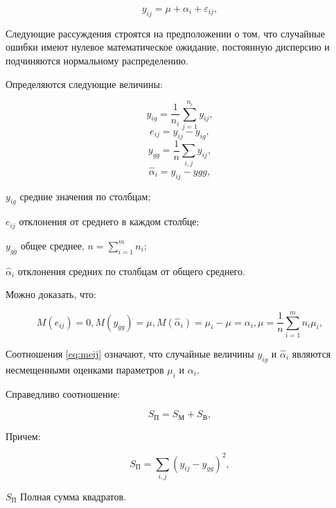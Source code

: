 \begin{equation}
\label{eq:watcha}
y_{ij} = \mu+\alpha_i+\varepsilon_{ij},
\end{equation}


Следующие рассуждения строятся на предположении о том, что случайные ошибки имеют нулевое математическое ожидание, постоянную дисперсию и подчиняются нормальному распределению.

Определяются следующие величины:

\begin{equation}
\label{eq:yig}
y_{ig}=\frac{1}{n_i}\sum_{j=1}^{n_i}{y_{ij}},
\end{equation}
\begin{equation}
\label{eq:eij}
e_{ij}=y_{ij}-y_{ig},
\end{equation}
\begin{equation}
\label{eq:ygg}
y_{gg}=\frac{1}{n}\sum_{i,j}{y_{ij}},
\end{equation}
\begin{equation}
\label{eq:alphai}
\widehat{\alpha}_i=y_{ij}-y{gg},
\end{equation}
\begin{eqexpl}[15mm]
\item{$y_{ig}$} средние значения по столбцам;
\item{$e_{ij}$} отклонения от среднего в каждом столбце;
\item{$y_{gg}$} общее среднее, $n=\sum_{i=1}^{m}{n_i}$;
\item{$\widehat{\alpha}_i$} отклонения средних по столбцам от общего среднего.
\end{eqexpl}

Можно доказать, что:

\begin{equation}
\label{eq:meij}
M(e_{ij})=0,M(y_{gg})=\mu,M(\widehat{\alpha}_i)=\mu_i-\mu=\alpha_i, \mu=\frac{1}{n}\sum_{i=1}^{m}{n_i\mu_i},
\end{equation}

Соотношения \eqref{eq:meij} означают, что случайные величины $y_{ig}$ и $\widehat{\alpha}_i$ являются несмещенными оценками параметров $\mu_i$ и $\alpha_i$.

Справедливо соотношение:

\begin{equation}
\label{eq:spsum}
S_П=S_М+S_В,
\end{equation}

Причем:

\begin{equation}
\label{eq:sp}
S_П=\sum_{i,j}{\left(y_{ij}-y_{gg}\right)^2},
\end{equation}
\begin{eqexpl}[15mm]
\item{$S_П$} Полная сумма квадратов.
\end{eqexpl}

